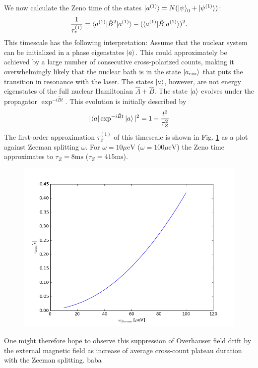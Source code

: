 \documentclass[aps, pra, amsfonts, a4paper, showpacs]{revtex4-1}
\begin{document}
We now calculate the Zeno time of the states $\ket{a^{(1)}}=N(\ket{\psi}_0 + \ket{\psi^{(1)}})$:
\[ \frac{1}{\tau_z^{(1)}} = \braket{a^{(1)} | \hat{B}^2 | a^{(1)}} - (\braket{a^{(1)} | \hat{B} | a^{(1)}})^2. \]
This timescale has the following interpretation:
Assume that the nuclear system can be initialized in a phase eigenstates $\ket{a}$. This could approximately be achieved by a large number of consecutive cross-polarized counts, making it overwhelmingly likely that the nuclear bath is in the state $\ket{a_{res}}$ that puts the transition in resonance with the laser. The states $\ket{a}$, however, are not energy eigenstates of the full nuclear Hamiltonian $\hat{A} + \hat{B}$. The state $\ket{a}$ evolves under the propagator $\exp^{-i \hat{B} t}$. This evolution is initially described by
\[
|\braket{a | \exp^{-i \hat{B} t} | a}|^2 =1- \frac{t^2}{\tau_Z^2} 
\]
The first-order approximation $\tau_Z^{(1)}$ of this timescale is shown in Fig. \ref{fig: tz} as a plot against Zeeman splitting $\omega$. For $\omega=10\mu \mathrm{eV}$ ($\omega=100 \mu \mathrm{eV}$) the Zeno time approximates to $\tau_Z=8 \mathrm{ms}$ ($\tau_Z=415 \mathrm{ms}$).

\begin{figure}
\includegraphics[width=0.6\linewidth]{zeno_redistribution.png}
\label{fig: tz}
\end{figure}

One might therefore hope to observe this suppression of Overhauser field drift by the external magnetic field as increase of average cross-count plateau duration with the Zeeman splitting. baba


\end{document}
